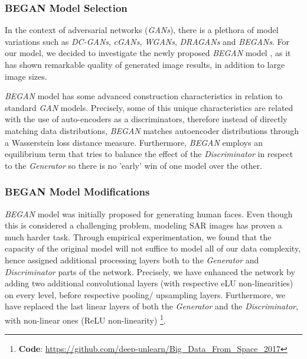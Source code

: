 \documentclass{article}
\begin{document}
\subsubsection{BEGAN Model Selection}

In the context of adversarial networks (\emph{GANs}), there is a plethora of model variations such 
as \emph{DC-GANs}, \emph{cGANs}, \emph{WGANs}, \emph{DRAGANs} and \emph{BEGANs}.
%
For our model, we decided to investigate the newly proposed \emph{BEGAN} model 
\cite{berthelot2017began}, as it has shown remarkable quality of generated image 
results, in addition to large image sizes.
%
%

\bigskip

\noindent
\emph{BEGAN} model has some advanced construction characteristics
in relation to standard \emph{GAN} models. Precisely, some of 
this unique characteristics are related with the use of auto-encoders as a
discriminators, therefore instead of directly matching data distributions,
\emph{BEGAN} matches autoencoder distributions through a Wasserstein loss 
distance measure.
%
Furthermore, \emph{BEGAN} employs an equilibrium term that tries to balance
the effect of the \emph{Discriminator} in respect to the \emph{Generator} so 
there is no 'early' win of one model over the other.

\subsubsection{BEGAN Model Modifications}

\emph{BEGAN} model was initially proposed for generating human faces.
Even though this is considered a challenging problem, modeling SAR images 
has proven a much harder task.
%
Through empirical experimentation, we found that the capacity of the original model will
not suffice to model all of our data complexity, hence assigned additional
processing layers both to the \emph{Generator} and \emph{Discriminator} parts
of the network.
%
Precisely, we have enhanced the network by adding two additional convolutional layers 
(with respective eLU non-linearities) on every level, before respective pooling/ upsampling 
layers.
%
Furthermore, we have replaced the last linear layers of both the \emph{Generator} and 
the \emph{Discriminator}, with non-linear ones (ReLU non-linearity)
\footnote{\textbf{Code}: \url{https://github.com/deep-unlearn/Big\_Data\_From\_Space\_2017}}.
\end{document}
